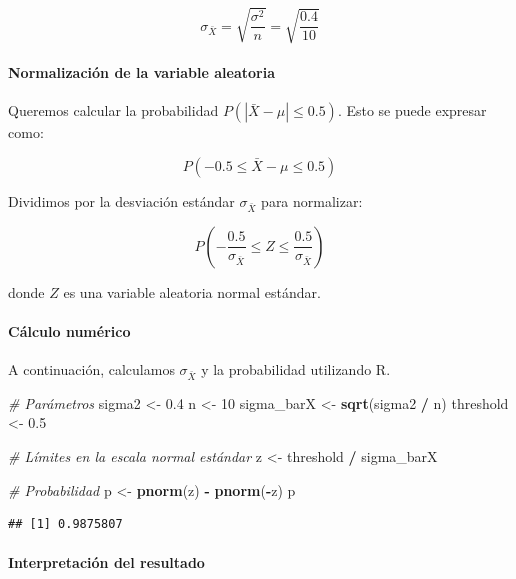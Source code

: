 \documentclass[
]{article}
\newenvironment{Shaded}{\begin{snugshade}}{\end{snugshade}}
\newcommand{\CommentTok}[1]{\textcolor[rgb]{0.56,0.35,0.01}{\textit{#1}}}
\newcommand{\DecValTok}[1]{\textcolor[rgb]{0.00,0.00,0.81}{#1}}
\newcommand{\FloatTok}[1]{\textcolor[rgb]{0.00,0.00,0.81}{#1}}
\newcommand{\FunctionTok}[1]{\textcolor[rgb]{0.13,0.29,0.53}{\textbf{#1}}}
\newcommand{\NormalTok}[1]{#1}
\newcommand{\OtherTok}[1]{\textcolor[rgb]{0.56,0.35,0.01}{#1}}
\newcommand{\SpecialCharTok}[1]{\textcolor[rgb]{0.81,0.36,0.00}{\textbf{#1}}}
\begin{document}
\[
\sigma_{\bar{X}} = \sqrt{\frac{\sigma^2}{n}} = \sqrt{\frac{0.4}{10}}
\]

\paragraph{Normalización de la variable aleatoria}\label{normalizaciuxf3n-de-la-variable-aleatoria}

Queremos calcular la probabilidad \(P(|\bar{X} - \mu| \leq 0.5)\). Esto se puede expresar como:

\[
P(-0.5 \leq \bar{X} - \mu \leq 0.5)
\]

Dividimos por la desviación estándar \(\sigma_{\bar{X}}\) para normalizar:

\[
P\left(-\frac{0.5}{\sigma_{\bar{X}}} \leq Z \leq \frac{0.5}{\sigma_{\bar{X}}}\right)
\]

donde \(Z\) es una variable aleatoria normal estándar.

\paragraph{Cálculo numérico}\label{cuxe1lculo-numuxe9rico}

A continuación, calculamos \(\sigma_{\bar{X}}\) y la probabilidad utilizando R.

\begin{Shaded}
\begin{Highlighting}[]
\CommentTok{\# Parámetros}
\NormalTok{sigma2 }\OtherTok{\textless{}{-}} \FloatTok{0.4}
\NormalTok{n }\OtherTok{\textless{}{-}} \DecValTok{10}
\NormalTok{sigma\_barX }\OtherTok{\textless{}{-}} \FunctionTok{sqrt}\NormalTok{(sigma2 }\SpecialCharTok{/}\NormalTok{ n)}
\NormalTok{threshold }\OtherTok{\textless{}{-}} \FloatTok{0.5}

\CommentTok{\# Límites en la escala normal estándar}
\NormalTok{z }\OtherTok{\textless{}{-}}\NormalTok{ threshold }\SpecialCharTok{/}\NormalTok{ sigma\_barX}

\CommentTok{\# Probabilidad}
\NormalTok{p }\OtherTok{\textless{}{-}} \FunctionTok{pnorm}\NormalTok{(z) }\SpecialCharTok{{-}} \FunctionTok{pnorm}\NormalTok{(}\SpecialCharTok{{-}}\NormalTok{z)}
\NormalTok{p}
\end{Highlighting}
\end{Shaded}

\begin{verbatim}
## [1] 0.9875807
\end{verbatim}

\paragraph{Interpretación del resultado}\label{interpretaciuxf3n-del-resultado-1}
\end{document}
